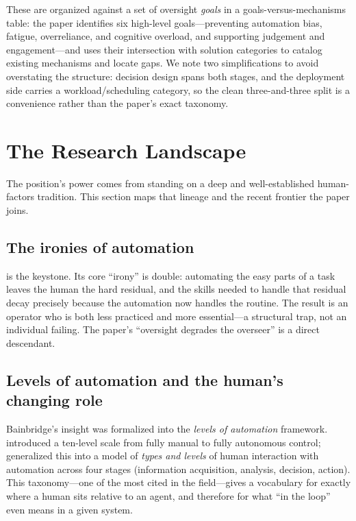\documentclass[11pt]{article}
\begin{document}
These are organized against a set of oversight \emph{goals} in a goals-versus-mechanisms
table: the paper identifies six high-level goals---preventing automation bias, fatigue,
overreliance, and cognitive overload, and supporting judgement and engagement---and uses
their intersection with solution categories to catalog existing mechanisms and locate gaps.
We note two simplifications to avoid overstating the structure: decision design spans both
stages, and the deployment side carries a workload/scheduling category, so the clean
three-and-three split is a convenience rather than the paper's exact taxonomy.

\section{The Research Landscape}
\label{sec:landscape}

The position's power comes from standing on a deep and well-established human-factors
tradition. This section maps that lineage and the recent frontier the paper joins.

\subsection{The ironies of automation}

\citet{bainbridge1983} is the keystone. Its core ``irony'' is double: automating the easy
parts of a task leaves the human the hard residual, and the skills needed to handle that
residual decay precisely because the automation now handles the routine. The result is an
operator who is both less practiced and more essential---a structural trap, not an
individual failing. The paper's ``oversight degrades the overseer'' is a direct descendant.

\subsection{Levels of automation and the human's changing role}

Bainbridge's insight was formalized into the \emph{levels of automation} framework.
\citet{sheridan1978} introduced a ten-level scale from fully manual to fully autonomous
control; \citet{parasuraman2000} generalized this into a model of \emph{types and levels}
of human interaction with automation across four stages (information acquisition, analysis,
decision, action). This taxonomy---one of the most cited in the field---gives a vocabulary
for exactly where a human sits relative to an agent, and therefore for what ``in the loop''
even means in a given system.
\end{document}
